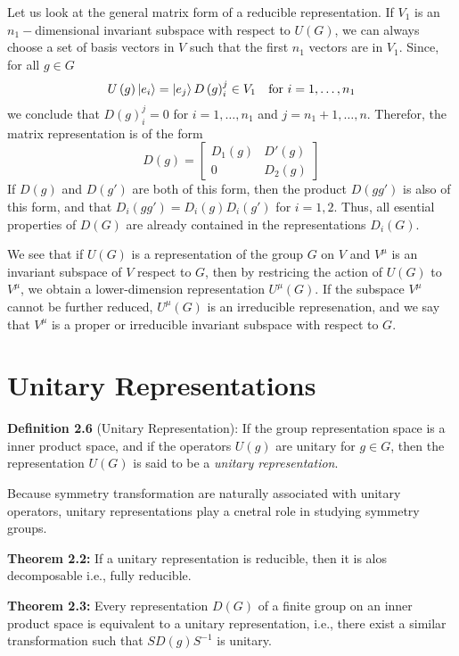 Let us look at the general matrix form of a reducible representation.
If $V_1$ is an $n_1-$dimensional invariant subspace with respect to $U \left( G \right)$, we can always choose a set of basis vectors in $V$ such that the first $n_1$ vectors are in $V_1$.
Since, for all $g\in G$
\begin{equation}
 U \left( g \right) \ket{e_i} = \ket{e_j} D \left( g \right)^j_i \in V_1 ~ ~ ~ \text{for}~ i= 1, \dots, n_{1} \nonumber
\end{equation}
we conclude that $D \left( g \right)_i^j = 0$ for $i=1, \dots, n_1$ and $j= n_1+1, \dots, n$.
Therefor, the matrix representation is of the form
\begin{equation}
  \label{eq:2.2-4}
  D \left( g \right) =
  \begin{bmatrix}
    D_1 \left( g \right) & D' \left( g \right) \\
    0 & D_2 \left( g \right)
  \end{bmatrix}
\end{equation}
If $D \left( g \right)$ and $D \left( g' \right)$ are both of this form, then the product $D \left( gg' \right)$ is also of this form, and that $D_i \left( gg' \right) = D_i \left( g \right) D_i \left( g' \right)$ for $i=1,2$.
Thus, all esential properties of $D \left( G \right)$ are already contained in the representations $D_i \left( G \right)$.

We see that if $U \left( G \right)$ is a representation of the group $G$ on $V$ and $V^{\mu}$ is an invariant subspace of $V$ respect to $G$, then by restricing the action of $U \left( G \right)$ to $V^{\mu}$, we obtain a lower-dimension representation $U^{\mu} \left( G \right)$.
If the subspace $V^{\mu}$ cannot be further reduced, $U^{\mu} \left( G \right)$ is an irreducible represenation, and we say that $V^{\mu}$ is a \textrm{proper or irreducible invariant subspace} with respect to $G$.

\section{Unitary Representations}
\textbf{Definition 2.6} (Unitary Representation): If the group representation space is a inner product space, and if the operators $U \left( g \right)$ are unitary for $g \in G$, then the representation $U \left( G \right)$ is said to be a \textit{unitary representation}.

Because symmetry transformation are naturally associated with unitary operators, unitary representations play a cnetral role in studying symmetry groups.

\textbf{Theorem 2.2:} If a unitary representation is reducible, then it is alos decomposable i.e., fully reducible.

\textbf{Theorem 2.3:} Every representation $D \left( G \right)$ of a finite group on an inner product space is equivalent to a unitary representation, i.e., there exist a similar transformation such that $S D \left( g \right) S^{-1}$ is unitary.






